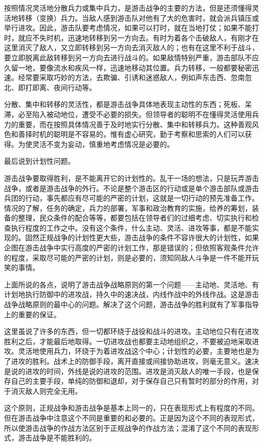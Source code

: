 按照情况灵活地分散兵力或集中兵力，是游击战争的主要的方法，但是还须懂得灵活地转移（变换）兵力。当敌人感到游击队对他有了大的危害时，就会派兵镇压或举行进攻。因此，游击队要考虑情况，如果可以打时，就在当地打仗；如果不能打时，就应不失时机，迅速地转移到另一方向去。有时为着各个击破敌人，有刚才在这里消灭了敌人，又立即转移到另一方向去消灭敌人的；也有在这里不利于战斗，要立即脱离此敌转移到另一方向去进行战斗的。如果敌情特别严重，游击部队不应久留一地，要像流水和疾风一样，迅速地移动其位置。兵力转移，一般都要秘密迅速。经常要采取巧妙的方法，去欺骗、引诱和迷惑敌人，例如声东击西、忽南忽北、即打即离、夜间行动等。

分散、集中和转移的灵活性，都是游击战争具体地表现主动性的东西；死板、呆滞，必至陷入被动地位，遭受不必要的损失。但领导者的聪明不在懂得灵活使用兵力的重要，而在按照具体情况善于及时地实行分散、集中和转移兵力。这种善观风色和善择时机的聪明是不容易的，惟有虚心研究，勤于考察和思索的人们可以获得。为使灵活不变为妄动，慎重地考虑情况是必要的。

最后说到计划性问题。

游击战争要取得胜利，是不能离开它的计划性的。乱干一场的想法，只是玩弄游击战争，或者是游击战争的外行。不论是整个游击区的行动或是单个游击部队或游击兵团的行动，事先都应有尽可能的严密的计划，这就是一切行动的预先准备工作。情况的了解，任务的确定，兵力的部署，军事和政治教育的实施，给养的筹划，装备的整理，民众条件的配合等等，都要包括在领导者们的过细考虑、切实执行和检查执行程度的工作之中。没有这个条件，什么主动、灵活、进攻等事，都是不能实现的。固然正规战争的计划性更大些，游击战争的条件不容许很大的计划性，如果企图在游击战争中实行高度的严密的计划工作，那是错误的；但依照客观条件允许的程度，采取尽可能的严密的计划，则是必要的，须知同敌人斗争是一件不能开玩笑的事情。

上面所说的各点，说明了游击战争战略原则的第一个问题——主动地、灵活地、有计划地执行防御中的进攻战，持久中的速决战，内线作战中的外线作战。这是游击战争战略原则的最中心的问题。解决了这个问题，游击战争的胜利就有了军事指导上的重要的保证。

这里虽说了许多的东西，但一切都环绕于战役和战斗的进攻。主动地位只有在进攻胜利之后，才能最后地取得。一切进攻战也都要主动地组织之，不要被迫地采取进攻。灵活地使用兵力，环绕于为着进攻战这个中心；计划性的必要，主要地也是为了进攻的胜利。战术上的防御手段，离开直接或间接协助进攻，则毫无意义。速决是说的进攻的时间，外线是说的进攻的范围。进攻是消灭敌人的唯一手段，也是保存自己的主要手段，单纯的防御和退却，对于保存自己只有暂时的部分的作用，对于消灭敌人则完全无用。

这个原则，正规战争和游击战争是基本上同一的，只在表现形式上有程度的不同。但在游击战争中注意这个不同是重要的和必要的。正是因为这个不同的表现形式，所以使游击战争的作战方法区别于正规战争的作战方法；混淆了这个不同的表现形式，游击战争是不能胜利的。

